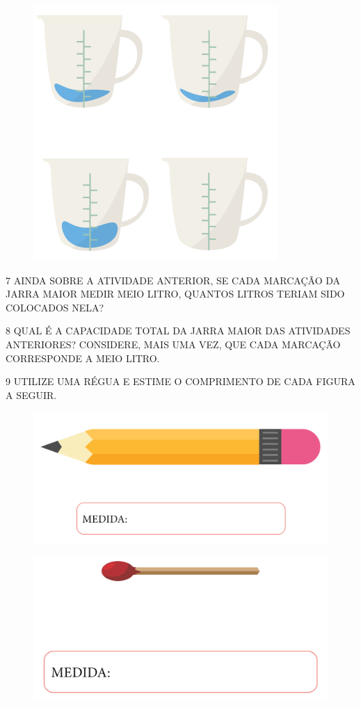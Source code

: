 \begin{figure}[htpb!]
\centering
\includegraphics[width=.4\textwidth]{./media/SAEB_1ANO_MAT_FIGURA39.png}
\end{figure}


\num{7} AINDA SOBRE A ATIVIDADE ANTERIOR, SE CADA MARCAÇÃO DA JARRA MAIOR MEDIR MEIO LITRO,
QUANTOS LITROS TERIAM SIDO COLOCADOS NELA?


\num{8} QUAL É A CAPACIDADE TOTAL DA JARRA MAIOR DAS ATIVIDADES ANTERIORES? CONSIDERE, MAIS UMA VEZ, QUE CADA MARCAÇÃO CORRESPONDE A MEIO LITRO.

\num{9} UTILIZE UMA RÉGUA E ESTIME O COMPRIMENTO DE CADA FIGURA A SEGUIR.

\begin{figure}[htpb!]
\centering
\includegraphics[width=.6\textwidth]{./media/SAEB_1ANO_MAT_FIGURA40.png}
\end{figure}

\begin{figure}[htpb!]
\centering
\includegraphics[width=.5\textwidth]{./media/SAEB_1ANO_MAT_FIGURA41.png}
\end{figure}

